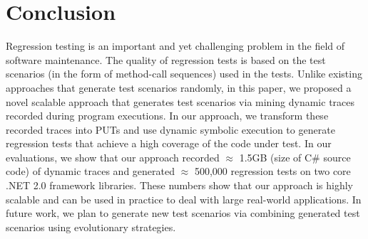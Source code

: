 \section{Conclusion}
\label{sec:concl}

Regression testing is an important and yet challenging problem in the field of software maintenance. The quality of regression tests is based on the test scenarios (in the form of method-call sequences) used in the tests. Unlike existing approaches that generate test scenarios randomly, in this paper, we proposed a novel scalable approach that generates test scenarios via mining dynamic traces recorded during program executions. In our approach, we transform these recorded traces into PUTs and use dynamic symbolic execution to generate regression tests that achieve a high coverage of the code under test. In our evaluations, we show that our approach recorded $\approx$ 1.5GB (size of C\# source code) of dynamic traces and generated $\approx$ 500,000 regression tests on two core .NET 2.0 framework libraries. These numbers show that our approach is highly scalable and can be used in practice to deal with large real-world applications. In future work, we plan to generate new test scenarios via combining generated test scenarios using evolutionary strategies.